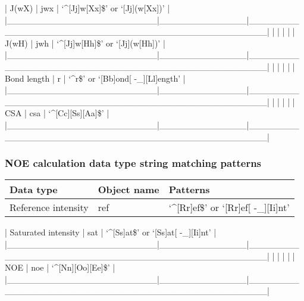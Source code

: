 | J(wX)                  | jwx          | `\^{}[Jj]w[Xx]\$' or `[Jj](w[Xx])'                   |
|\_\_\_\_\_\_\_\_\_\_\_\_\_\_\_\_\_\_\_\_\_\_\_\_|\_\_\_\_\_\_\_\_\_\_\_\_\_\_|\_\_\_\_\_\_\_\_\_\_\_\_\_\_\_\_\_\_\_\_\_\_\_\_\_\_\_\_\_\_\_\_\_\_\_\_\_\_\_\_\_\_\_\_\_\_\_\_\_\_|
|                        |              |                                                  |
| J(wH)                  | jwh          | `\^{}[Jj]w[Hh]\$' or `[Jj](w[Hh])'                   |
|\_\_\_\_\_\_\_\_\_\_\_\_\_\_\_\_\_\_\_\_\_\_\_\_|\_\_\_\_\_\_\_\_\_\_\_\_\_\_|\_\_\_\_\_\_\_\_\_\_\_\_\_\_\_\_\_\_\_\_\_\_\_\_\_\_\_\_\_\_\_\_\_\_\_\_\_\_\_\_\_\_\_\_\_\_\_\_\_\_|
|                        |              |                                                  |
| Bond length            | r            | `\^{}r\$' or `[Bb]ond[ -\_][Ll]ength'                 |
|\_\_\_\_\_\_\_\_\_\_\_\_\_\_\_\_\_\_\_\_\_\_\_\_|\_\_\_\_\_\_\_\_\_\_\_\_\_\_|\_\_\_\_\_\_\_\_\_\_\_\_\_\_\_\_\_\_\_\_\_\_\_\_\_\_\_\_\_\_\_\_\_\_\_\_\_\_\_\_\_\_\_\_\_\_\_\_\_\_|
|                        |              |                                                  |
| CSA                    | csa          | `\^{}[Cc][Ss][Aa]\$'                                 |
|\_\_\_\_\_\_\_\_\_\_\_\_\_\_\_\_\_\_\_\_\_\_\_\_|\_\_\_\_\_\_\_\_\_\_\_\_\_\_|\_\_\_\_\_\_\_\_\_\_\_\_\_\_\_\_\_\_\_\_\_\_\_\_\_\_\_\_\_\_\_\_\_\_\_\_\_\_\_\_\_\_\_\_\_\_\_\_\_\_|




\subsubsection{NOE calculation data type string matching patterns}



\begin{center}
\begin{tabular}{lll}
\toprule
Data type & Object name & Patterns \\
\midrule
 Reference intensity     &  ref           &  `\^{}[Rr]ef\$' or `[Rr]ef[ -\_][Ii]nt'                 \\
\bottomrule
\end{tabular}
\end{center}

| Saturated intensity    | sat          | `\^{}[Ss]at\$' or `[Ss]at[ -\_][Ii]nt'                |
|\_\_\_\_\_\_\_\_\_\_\_\_\_\_\_\_\_\_\_\_\_\_\_\_|\_\_\_\_\_\_\_\_\_\_\_\_\_\_|\_\_\_\_\_\_\_\_\_\_\_\_\_\_\_\_\_\_\_\_\_\_\_\_\_\_\_\_\_\_\_\_\_\_\_\_\_\_\_\_\_\_\_\_\_\_\_\_\_\_|
|                        |              |                                                  |
| NOE                    | noe          | `\^{}[Nn][Oo][Ee]\$'                                 |
|\_\_\_\_\_\_\_\_\_\_\_\_\_\_\_\_\_\_\_\_\_\_\_\_|\_\_\_\_\_\_\_\_\_\_\_\_\_\_|\_\_\_\_\_\_\_\_\_\_\_\_\_\_\_\_\_\_\_\_\_\_\_\_\_\_\_\_\_\_\_\_\_\_\_\_\_\_\_\_\_\_\_\_\_\_\_\_\_\_|


